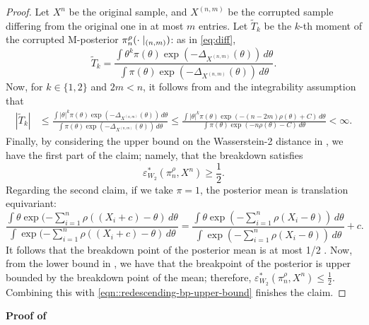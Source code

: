 \documentclass[11pt, oneside]{amsart}
\theoremstyle{definition}   %
\let\P\relax
\newcommand{\P}{\mathbb{P}}
\newcommand{\loss}{\rho}
\newcommand{\mposterior}{\pi_n^{\loss}}
\newcommand{\corruptedsample}{X^{(n,m)}}
\begin{document}
\begin{proof}
    Let \( X^n\) be the original sample, and \( \corruptedsample\) be the corrupted sample differing from the original one in at most \( m \) entries.
    Let  \( \widetilde T_k\) be the \(k\)-th moment of the corrupted M-posterior \( \mposterior (\cdot \mid \P_{(n, m)}) \): as in \eqref{eq:diff},
    \[
        \widetilde T_k = 
        \frac{\int \theta^k \pi(\theta) \exp \left (  - \Delta_{\corruptedsample} (\theta) \right )  \, d\theta}{\int \pi(\theta) \exp \left (  -\Delta_{\corruptedsample} (\theta) \right ) \, d\theta}.
    \]
    Now, for \( k \in \{ 1, 2\}\) and \( 2m < n\), it follows from  and the integrability assumption that
    \begin{equation*}
    \begin{split}
        \left | \widetilde T_k \right | 
        &\leq 
        \frac{\int  |\theta|^k \pi(\theta) \exp \left (  - \Delta_{\corruptedsample} (\theta) \right ) \, d\theta}{\int \pi(\theta) \exp \left (  -\Delta_{\corruptedsample} (\theta) \right ) \, d\theta} 
        \leq 
        \frac{\int | \theta |^k \pi(\theta) \exp \left (  - ( n - 2m ) \rho (\theta) + C \right )  \, d\theta}{\int \pi(\theta) \exp \left (  -  n \rho (\theta) - C\right ) \, d\theta} < \infty.
    \end{split}
    \end{equation*}
    Finally, by considering the upper bound on the Wasserstein-2 distance in , we have the first part of the claim; namely, that the breakdown satisfies
    \begin{equation}
    \label{eqn::redescending-bp-upper-bound}
        \varepsilon^*_{W_2}(\pi^\rho_n, X^n) \geq \frac{1}{2}.
    \end{equation}
   Regarding the second claim, if we take \( \pi = 1 \), the posterior mean is translation equivariant:
    \[
        \frac{\int \theta \exp(-\sum_{i=1}^n \loss((X_i + c) - \theta) \, d \theta} {\int \exp(-\sum_{i=1}^n \loss((X_i + c) - \theta) \, d \theta}  
        =
        \frac{\int \theta \exp(-\sum_{i=1}^n \loss(X_i - \theta)) \, d \theta} {\int \exp(-\sum_{i=1}^n \loss(X_i - \theta)) \, d \theta}  + c.
    \]
    It follows that the breakdown point of the posterior mean is at most 1/2 \citep{donoho:huber1983}. Now, from the lower bound in , we have that the breakpoint of the posterior is upper bounded by the breakdown point of the mean; therefore, \( \varepsilon^*_{W_2}(\pi^\rho_n, X^n) \leq \frac{1}{2}\). Combining this with \eqref{eqn::redescending-bp-upper-bound} finishes the claim.
\end{proof}
%
%
\noindent \textbf{Proof of }
\end{document}
